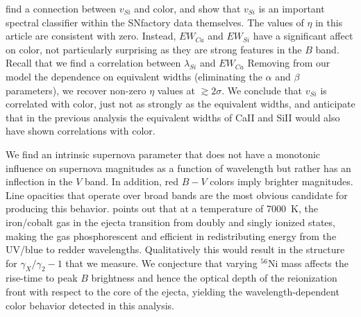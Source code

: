 \documentclass{aastex}   	%
\begin{document}
%


\citet{2009ApJ...699L.139W, 2011ApJ...729...55F} find a connection between $v_{Si}$ and color, and  
\citet{2015MNRAS.447.1247S} show that $v_{Si}$ is an important spectral classifier within the SNfactory data themselves.
The values of $\eta$ in this article are consistent with zero. Instead,  $EW_{Ca}$ and $EW_{Si}$ have a significant affect on color, not particularly 
surprising as they
are strong features in the $B$ band.
Recall that we find a correlation between $\lambda_{Si}$ and $EW_{Ca}$
Removing from our model the dependence on equivalent widths (eliminating the  $\alpha$ and $\beta$ parameters), we recover
non-zero $\eta$ values at  $\gtrsim 2\sigma$.  We conclude that $v_{Si}$ is correlated with color, just not as strongly as the equivalent widths,
and  anticipate that in the previous analysis the equivalent widths of CaII and 
SiII would also have shown correlations with color.


We find an intrinsic supernova parameter that does not have a monotonic influence on supernova magnitudes as a function
of wavelength but rather has an inflection in the $V$ band.  In addition, red $B-V$ colors imply brighter magnitudes.  Line opacities
that operate over broad bands are the most obvious candidate for producing this behavior.
\citet{2006ApJ...649..939K} points out that at a temperature of 7000~K, the iron/cobalt gas in the ejecta transition
from doubly and singly ionized states, making the gas phosphorescent and efficient in redistributing energy from the UV/blue to redder
wavelengths.  Qualitatively this would result in the structure for $\gamma_X/\gamma_2-1$ that we measure.
We conjecture that varying $^{56}$Ni mass affects the rise-time to peak $B$ brightness and hence the optical depth
of the reionization front with respect to the core of the ejecta, yielding the wavelength-dependent color behavior
detected in this analysis.
\end{document}
